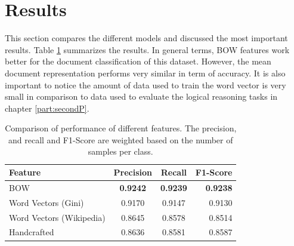 




\section{Results}
\label{sec:w2v4tc_results}

This section compares the different models and discussed the most important
results.  Table \ref{tab:w2v4tc_ginig_w2v_main_comparisson}
summarizes the results.  In general terms,  \ac{BOW} features work better for
the document classification of this dataset. However, the mean document
representation performs very similar in term of accuracy. It is also important to
notice the amount of data used to train the word vector is very
small in comparison to data used to evaluate the logical reasoning tasks in
chapter \ref{part:secondP}. 

\begin{table}[ht!]
  \centering
  \caption{Comparison of performance of different features. The precision,
    and recall and F1-Score are weighted based on the number of samples per class.}
  \label{tab:w2v4tc_ginig_w2v_main_comparisson}
  
  \small
  \begin{tabular}{|l|c|c|r|}
    \hline
    Feature                   &  Precision  &  Recall  &  F1-Score  \\
    \hline
    \ac{BOW}                  &     \textbf{0.9242}  & \textbf{ 0.9239}  &   \textbf{ 0.9238}  \\
    Word Vectors (Gini)       &     0.9170  &  0.9147  &    0.9130  \\
    Word Vectors (Wikipedia)  &     0.8645  &  0.8578  &    0.8514  \\
    Handcrafted               &     0.8636  &  0.8581  &    0.8587  \\  
   \hline
  \end{tabular}
\end{table}

